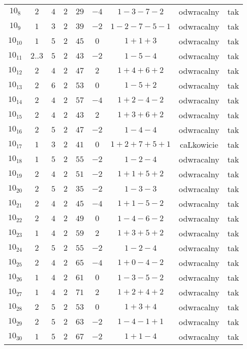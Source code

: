 \begin{longtable}{ccccccccc}
$10_{8}$ & $2$ & $4$ & $2$ & $29$ & $-4$ & $1-3-7-2$ & odwracalny & tak \\
$10_{9}$ & $1$ & $3$ & $2$ & $39$ & $-2$ & $1-2-7-5-1$ & odwracalny & tak \\
$10_{10}$ & $1$ & $5$ & $2$ & $45$ & $0$ & $1+1+3$ & odwracalny & tak \\
$10_{11}$ & $2..3$ & $5$ & $2$ & $43$ & $-2$ & $1-5-4$ & odwracalny & tak \\
$10_{12}$ & $2$ & $4$ & $2$ & $47$ & $2$ & $1+4+6+2$ & odwracalny & tak \\
$10_{13}$ & $2$ & $6$ & $2$ & $53$ & $0$ & $1-5+2$ & odwracalny & tak \\
$10_{14}$ & $2$ & $4$ & $2$ & $57$ & $-4$ & $1+2-4-2$ & odwracalny & tak \\
$10_{15}$ & $2$ & $4$ & $2$ & $43$ & $2$ & $1+3+6+2$ & odwracalny & tak \\
$10_{16}$ & $2$ & $5$ & $2$ & $47$ & $-2$ & $1-4-4$ & odwracalny & tak \\
$10_{17}$ & $1$ & $3$ & $2$ & $41$ & $0$ & $1+2+7+5+1$ & caLkowicie & tak \\
$10_{18}$ & $1$ & $5$ & $2$ & $55$ & $-2$ & $1-2-4$ & odwracalny & tak \\
$10_{19}$ & $2$ & $4$ & $2$ & $51$ & $-2$ & $1+1+5+2$ & odwracalny & tak \\
$10_{20}$ & $2$ & $5$ & $2$ & $35$ & $-2$ & $1-3-3$ & odwracalny & tak \\
$10_{21}$ & $2$ & $4$ & $2$ & $45$ & $-4$ & $1+1-5-2$ & odwracalny & tak \\
$10_{22}$ & $2$ & $4$ & $2$ & $49$ & $0$ & $1-4-6-2$ & odwracalny & tak \\
$10_{23}$ & $1$ & $4$ & $2$ & $59$ & $2$ & $1+3+5+2$ & odwracalny & tak \\
$10_{24}$ & $2$ & $5$ & $2$ & $55$ & $-2$ & $1-2-4$ & odwracalny & tak \\
$10_{25}$ & $2$ & $4$ & $2$ & $65$ & $-4$ & $1+0-4-2$ & odwracalny & tak \\
$10_{26}$ & $1$ & $4$ & $2$ & $61$ & $0$ & $1-3-5-2$ & odwracalny & tak \\
$10_{27}$ & $1$ & $4$ & $2$ & $71$ & $2$ & $1+2+4+2$ & odwracalny & tak \\
$10_{28}$ & $2$ & $5$ & $2$ & $53$ & $0$ & $1+3+4$ & odwracalny & tak \\
$10_{29}$ & $2$ & $5$ & $2$ & $63$ & $-2$ & $1-4-1+1$ & odwracalny & tak \\
$10_{30}$ & $1$ & $5$ & $2$ & $67$ & $-2$ & $1+1-4$ & odwracalny & tak \\

\end{longtable}
